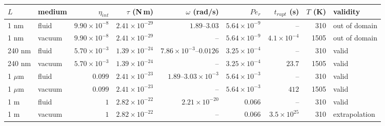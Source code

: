 \begin{tabular}{llrrrrrrl}
\hline
$L$ & medium & $\eta_{int}$ & $\tau$ (N\,m) & $\omega$ (rad/s) & $Pe_r$ & $t_{rupt}$ (s) & $T$ (K) & validity \\
\hline
1 nm & fluid & $9.90\times10^{-8}$ & $2.41\times10^{-29}$ & $1.89$--$3.03$ & $5.64\times10^{-9}$ & -- & 310 & out of domain \\
1 nm & vacuum & $9.90\times10^{-8}$ & $2.41\times10^{-29}$ & -- & $5.64\times10^{-9}$ & $4.1\times10^{-4}$ & 1505 & out of domain \\
240 nm & fluid & $5.70\times10^{-3}$ & $1.39\times10^{-24}$ & $7.86\times10^{-3}$--$0.0126$ & $3.25\times10^{-4}$ & -- & 310 & valid \\
240 nm & vacuum & $5.70\times10^{-3}$ & $1.39\times10^{-24}$ & -- & $3.25\times10^{-4}$ & $23.7$ & 1505 & valid \\
1 $\mu$m & fluid & $0.099$ & $2.41\times10^{-23}$ & $1.89$--$3.03\times10^{-3}$ & $5.64\times10^{-3}$ & -- & 310 & valid \\
1 $\mu$m & vacuum & $0.099$ & $2.41\times10^{-23}$ & -- & $5.64\times10^{-3}$ & $412$ & 1505 & valid \\
1 m & fluid & $1$ & $2.82\times10^{-22}$ & $2.21\times10^{-20}$ & $0.066$ & -- & 310 & valid \\
1 m & vacuum & $1$ & $2.82\times10^{-22}$ & -- & $0.066$ & $3.5\times10^{25}$ & 310 & extrapolation \\
\hline
\end{tabular}
